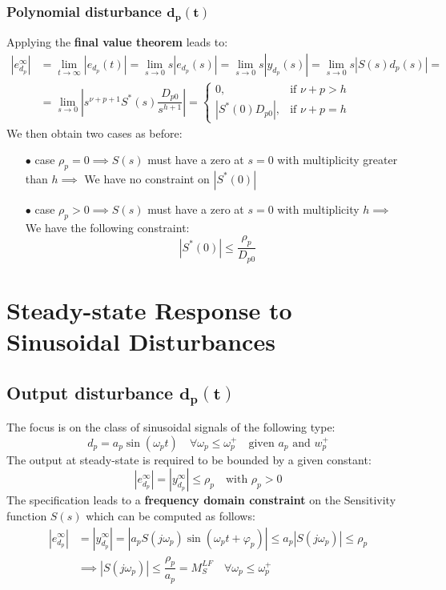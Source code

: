 \documentclass{article}
\numberwithin{equation}{subsection}
\begin{document}
	\subsubsection{Polynomial disturbance $\bm{d_p(t)}$}
	Applying the \textbf{final value theorem} leads to:
	\begin{align}
		\left| e_{d_p}^\infty \right| &= \displaystyle\lim_{t\to\infty} 	\left|e_{d_p}(t)\right| = \displaystyle\lim_{s\to0}s \left|e_{d_p}(s)\right| = \displaystyle\lim_{s\to0}s \left|y_{d_p}(s)\right| = \displaystyle\lim_{s\to0}s \left| S(s)d_p(s) \right| = \nonumber \\
		&= \displaystyle\lim_{s\to0}	\left|s^{\nu+p+1}S^*(s)\dfrac{D_{p0}}{s^{h+1}}\right| =
		\begin{cases}
			0, & \text{if } \nu+p>h \\
			\left|S^*(0)D_{p0}\right|, & \text{if } \nu+p = h
		\end{cases}
	\end{align}
	We then obtain two cases as before:
	\begin{enumerate}
		\item[$\bullet$] case $\rho_p=0 \implies S(s)$ must have a zero at $s=0$ with multiplicity greater than $h \implies$ We have no constraint on $\left|S^*(0)\right| $ 
		\item[$\bullet$] case $\rho_p>0 \implies S(s)$ must have a zero at $s=0$ with multiplicity $h \implies$ We have the following constraint:
		\begin{equation}
			\left|S^*(0)\right| \leq \dfrac{\rho_p}{D_{p0}}	
		\end{equation}
	\end{enumerate}
	
	\section{Steady-state Response to Sinusoidal Disturbances}
	\subsection{Output disturbance $\bm{d_p(t)}$}
	The focus is on the class of sinusoidal signals of the following type:
	\begin{equation}
		d_p = a_p\sin(\omega_pt) \quad \forall\omega_p\leq\omega_p^+ \quad \text{given } a_p \text{ and } w_p^+
	\end{equation}
	The output at steady-state is required to be bounded by a given constant:
	\begin{equation}
		\left| e_{d_p}^\infty \right| = \left| y_{d_p}^\infty \right| \leq \rho_p \quad \text{with } \rho_p>0
	\end{equation}
	The specification leads to a \textbf{frequency domain constraint} on the Sensitivity function $S(s)$ which can be computed as follows:
	\begin{align}
		\left| e_{d_p}^\infty \right| &= \left| y_{d_p}^\infty \right| = \left| a_pS(j\omega_p)\sin(\omega_pt+\varphi_p) \right| \leq a_p\left|S(j\omega_p)\right| \leq \rho_p \nonumber \\
		&\implies \left|S(j\omega_p)\right| \leq \dfrac{\rho_p}{a_p} = M_S^{LF} \quad \forall\omega_p \leq \omega_p^+
	\end{align}
	
\end{document}
